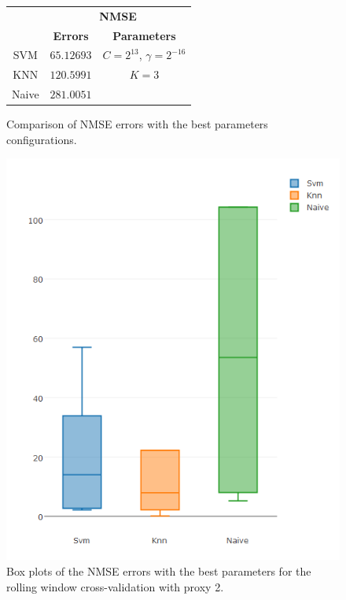 \begin{figure}[!h]
\centering
\begin{tabular}{|c|c|c|}
   \hline
   & \multicolumn{2}{|c|}{\textbf{NMSE}} \\ \cline{2-3}
   & \textbf{Errors} & \textbf{Parameters}          \\ \hline
   SVM  &  $65.12693$  & $C = 2^{13}$, $\gamma = 2^{-16}$          \\ 
   KNN & $120.5991$  & $K = 3$ \\ 
   Naive & $281.0051$ &      \\ 
   \hline
   \end{tabular}
\caption{Comparison of NMSE errors with the best parameters configurations.}
\label{fig:table10yNMSEp2}
\centering
\includegraphics[width=\linewidth]{img/10yproxy2NMSE.png}
\caption{Box plots of the NMSE errors with the best parameters for the rolling window cross-validation with proxy 2.}
\end{figure}


